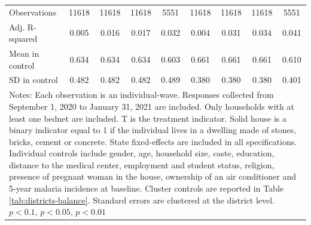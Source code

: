 {{\begin{tabular}{l*{8}{c}}
\hline
Observations    &\num{11618}         &\num{11618}         &\num{11618}         &\num{5551}         &\num{11618}         &\num{11618}         &\num{11618}         &\num{5551}         \\
Adj. R-squared  &    0.005         &    0.016         &    0.017         &    0.032         &    0.004         &    0.031         &    0.034         &    0.041         \\
Mean in control &    0.634         &    0.634         &    0.634         &    0.603         &    0.661         &    0.661         &    0.661         &    0.610         \\
SD in control   &    0.482         &    0.482         &    0.482         &    0.489         &    0.380         &    0.380         &    0.380         &    0.401         \\
\hline\hline
\multicolumn{9}{p{1.02\linewidth}}{\scriptsize Notes: Each observation is an individual-wave. Responses collected from September 1, 2020 to January 31, 2021 are included. Only households with at least one bednet are included. T is the treatment indicator. Solid house is a binary indicator equal to 1 if the individual lives in a dwelling made of stones, bricks, cement or concrete. State fixed-effects are included in all specifications. Individual controls include gender, age, household size, caste, education, distance to the medical center, employment and student status, religion, presence of pregnant woman in the house, ownership of an air conditioner and 5-year malaria incidence at baseline. Cluster controls are reported in Table \ref{tab:districts-balance}. Standard errors are clustered at the district level. \sym{*} \(p<0.1\), \sym{**} \(p<0.05\), \sym{***} \(p<0.01\)}\\
\end{tabular}
}%

}
